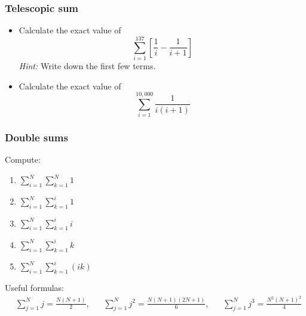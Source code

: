 \documentclass[14pt]{beamer}
\begin{document}
\begin{frame}[t]
	\frametitle{Telescopic sum}

	\begin{itemize}
		\item Calculate the exact value of
			\[
				\sum_{i=1}^{137}\left[ \frac{1}{i}- \frac{1}{i+1}\right]
			\]
			\emph{Hint:} Write down the first few terms.


		\item Calculate the exact value of
			\[
				\sum_{i=1}^{10,000}\frac{1}{i(i+1)}
			\]
	\end{itemize}
\end{frame}

\begin{frame}[t]
	\frametitle{Double sums}

	Compute:
	\begin{multicols}{3}
		\begin{enumerate}
			\item $\displaystyle \sum_{i=1}^{N}\sum_{k=1}^{N}1$

			\item $\displaystyle \sum_{i=1}^{N}\sum_{k=1}^{i}1$

			\item $\displaystyle \sum_{i=1}^{N}\sum_{k=1}^{i}i$

			\item $\displaystyle \sum_{i=1}^{N}\sum_{k=1}^{i}k$

			\item $\displaystyle \sum_{i=1}^{N}\sum_{k=1}^{i}(ik)$
		\end{enumerate}
	\end{multicols}

	\vfill

	{\fontsize{10}{10}\selectfont Useful formulas: \begin{align*}&\sum_{j=1}^{N}j = \frac{N(N+1)}{2},&&\sum_{j=1}^{N}j^{2}= \frac{N(N+1)(2N+1)}{6},&&\sum_{j=1}^{N}j^{3}= \frac{N^{2}(N+1)^{2}}{4}\end{align*} }
\end{frame}
\end{document}
